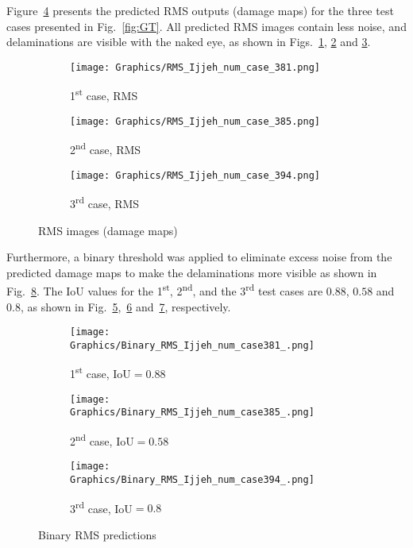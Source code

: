 \documentclass{IOS-Book-Article}
\begin{document}
Figure~\ref{fig:num_cases} presents the predicted RMS outputs (damage maps) for the three test cases presented in Fig.~\ref{fig:GT}.
All predicted RMS images contain less noise, and delaminations are visible with the naked eye, as shown in Figs.~\ref{fig:num_1st_case}, \ref{fig:num_2nd_case} and \ref{fig:num_3rd_case}.
\begin{figure}[ht!]
	\centering
	\begin{subfigure}[b]{0.32\textwidth}
		\centering
		\texttt{[image: Graphics/RMS\_Ijjeh\_num\_case\_381.png]}
		\caption{1\textsuperscript{st} case, RMS}
		\label{fig:num_1st_case}
	\end{subfigure}
	\hfill
	\begin{subfigure}[b]{0.32\textwidth}
		\centering
		\texttt{[image: Graphics/RMS\_Ijjeh\_num\_case\_385.png]}
		\caption{2\textsuperscript{nd} case, RMS}
		\label{fig:num_2nd_case}
	\end{subfigure}
	\hfill
	\begin{subfigure}[b]{0.32\textwidth}
		\centering
		\texttt{[image: Graphics/RMS\_Ijjeh\_num\_case\_394.png]}
		\caption{3\textsuperscript{rd} case, RMS}
		\label{fig:num_3rd_case}
	\end{subfigure}
	\caption{RMS images (damage maps)}
	\label{fig:num_cases}
\end{figure}

Furthermore, a binary threshold was applied to eliminate excess noise from the predicted damage maps to make the delaminations more visible as shown in Fig.~\ref{fig:RMS_num_cases}.
The IoU values for the 1\textsuperscript{st}, 2\textsuperscript{nd}, and the 3\textsuperscript{rd} test cases are $0.88$, $0.58$ and $0.8$, as shown in Fig.~\ref{fig:Binary_RMS_381},~\ref{fig:Binary_RMS_385} and~\ref{fig:Binary_RMS_394}, respectively.
\begin{figure}
	\begin{subfigure}[b]{0.32\textwidth}
		\centering
		\texttt{[image: Graphics/Binary\_RMS\_Ijjeh\_num\_case381\_.png]}
		\caption{1\textsuperscript{st} case, IoU\(=0.88\)}
		\label{fig:Binary_RMS_381}
	\end{subfigure}
	\hfill	
	\begin{subfigure}[b]{0.32\textwidth}
		\centering
		\texttt{[image: Graphics/Binary\_RMS\_Ijjeh\_num\_case385\_.png]}
		\caption{2\textsuperscript{nd} case, IoU\(=0.58\)}
		\label{fig:Binary_RMS_385}
	\end{subfigure}
	\hfill
	\begin{subfigure}[b]{0.32\textwidth}
		\centering
		\texttt{[image: Graphics/Binary\_RMS\_Ijjeh\_num\_case394\_.png]}
		\caption{3\textsuperscript{rd} case, IoU\(=0.8\)}
		\label{fig:Binary_RMS_394}
	\end{subfigure}
	\caption{Binary RMS predictions}
	\label{fig:RMS_num_cases}
\end{figure}
\end{document}

